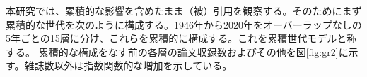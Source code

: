 本研究では、累積的な影響を含めたまま（被）引用を観察する。そのためにまず累積的な世代を次のように構成する。1946年から2020年をオーバーラップなしの5年ごとの15層に分け、これらを累積的に構成する。これを累積世代モデルと称する。
累積的な構成をなす前の各層の論文収録数およびその他を図\ref{fig:gr2}に示す。雑誌数以外は指数関数的な増加を示している。

